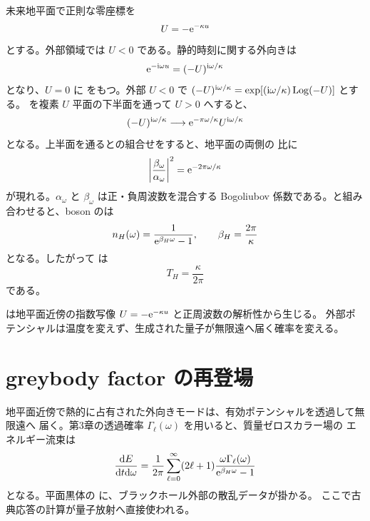 未来地平面で正則な零座標を
\begin{equation}
U
=
-\mathrm{e}^{-\kappa u}
\label{eq:kruskal-U}
\end{equation}
とする。外部領域では $U<0$ である。静的時刻に関する外向きは
\begin{equation}
\mathrm{e}^{-\mathrm{i}\omega u}
=
(-U)^{\mathrm{i}\omega/\kappa}
\label{eq:rindler-mode-U}
\end{equation}
となり、$U=0$ に  をもつ。外部 $U<0$ で
$(-U)^{\mathrm{i}\omega/\kappa}=\exp[(\mathrm{i}\omega/\kappa)\operatorname{Log}(-U)]$ とする。
を複素 $U$ 平面の下半面を通って $U>0$ へすると、
\begin{equation}
(-U)^{\mathrm{i}\omega/\kappa}
\longrightarrow
\mathrm{e}^{-\pi\omega/\kappa}
U^{\mathrm{i}\omega/\kappa}
\label{eq:horizon-branch-continuation}
\end{equation}
となる。上半面を通るとの組合せをすると、地平面の両側の
比に
\begin{equation}
\left|
\frac{\beta_\omega}{\alpha_\omega}
\right|^2
=
\mathrm{e}^{-2\pi\omega/\kappa}
\label{eq:bogoliubov-thermal-ratio}
\end{equation}
が現れる。$\alpha_\omega$ と $\beta_\omega$ は正・負周波数を混合する Bogoliubov
係数である。と組み合わせると、boson のは
\begin{equation}
n_H(\omega)
=
\frac{1}{\mathrm{e}^{\beta_H\omega}-1},
\qquad
\beta_H
=
\frac{2\pi}{\kappa}
\label{eq:hawking-occupation}
\end{equation}
となる。したがって は
\begin{equation}
T_H
=
\frac{\kappa}{2\pi}
\label{eq:hawking-temperature}
\end{equation}
である\cite{Hawking:1975vcx,BirrellDavies:1982}。

\begin{principlebox}
は地平面近傍の指数写像 $U=-\mathrm{e}^{-\kappa u}$ と正周波数の解析性から生じる。
外部ポテンシャルは温度を変えず、生成された量子が無限遠へ届く確率を変える。
\end{principlebox}

\section{greybody factor の再登場}

地平面近傍で熱的に占有された外向きモードは、有効ポテンシャルを透過して無限遠へ
届く。第3章の透過確率 $\Gamma_\ell(\omega)$ を用いると、質量ゼロスカラー場の
エネルギー流束は
\begin{equation}
\frac{\mathrm{d} E}{\mathrm{d} t\mathrm{d}\omega}
=
\frac{1}{2\pi}
\sum_{\ell=0}^{\infty}
(2\ell+1)
\frac{
\omega\Gamma_\ell(\omega)
}{
\mathrm{e}^{\beta_H\omega}-1
}
\label{eq:hawking-greybody-flux}
\end{equation}
となる。平面黒体の に、ブラックホール外部の散乱データが掛かる。
ここで古典応答の計算が量子放射へ直接使われる。

